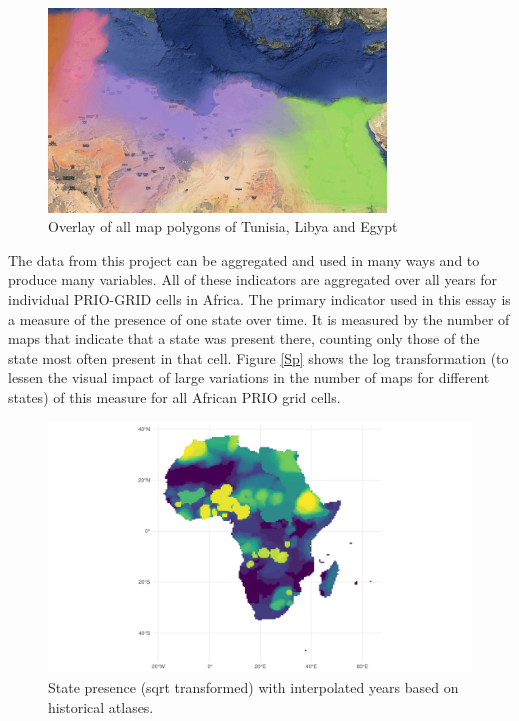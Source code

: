 \documentclass[12pt]{article}
\begin{document}
\begin{figure}[htpb]
	\centering
	\includegraphics[width=0.8\textwidth,keepaspectratio]{../TUNLIBEGY.pdf}
	\caption{Overlay of all map polygons of Tunisia, Libya and Egypt}
	\label{overlay}
\end{figure}

\begin{multicols}{2}

The data from this project can be aggregated and used in many ways and to
produce many variables. All of these indicators are aggregated over all years
for individual PRIO-GRID cells in Africa. The primary indicator used in this
essay is a measure of the presence of one state over time. It is measured by the
number of maps that indicate that a state was present there, counting only those
of the state most often present in that cell. Figure \ref{Sp} shows the log
transformation (to lessen the visual impact of large variations in the number of
maps for different states) of this measure for all African PRIO grid cells.

\end{multicols}

\begin{figure}[htpb]
	\centering
	\includegraphics[width=\linewidth]{../R/Output/sp_os_i_sum_any_plot.pdf}
	\caption{State presence (sqrt transformed) with interpolated years based
	on historical atlases.}
	\label{Sp_i}
\end{figure}
\end{document}
